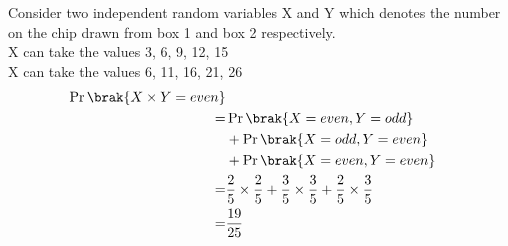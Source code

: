 Consider two independent random variables X and Y which denotes the number on the chip drawn from box 1 and box 2 respectively.\\
X can take the values 3, 6, 9, 12, 15\\
X can take the values 6, 11, 16, 21, 26
\begin{align}
\Pr\brak{X\times Y=even}\notag\\
=&\Pr\brak{X=even,Y=odd}\notag\\&+\Pr\brak{X=odd,Y=even}\notag\\&+\Pr\brak{X=even,Y=even}\\
=&\frac{2}{5}\times\frac{2}{5}+\frac{3}{5}\times\frac{3}{5}+\frac{2}{5}\times\frac{3}{5}\\
=&\frac{19}{25}
\end{align}